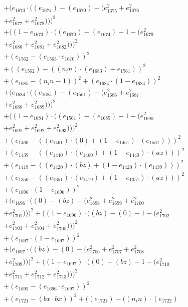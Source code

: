 \documentclass[10pt, a4paper]{article}
\begin{document}
\begin{small}
\begin{align*}
& + (e_{1673}  \cdot  ((e_{1674}) - (e_{1670}) - (e_{1675}^{2} + e_{1676}^{2} \\
& + e_{1677}^{2} + e_{1678}^{2})))^{2} \\
& + ((1 - e_{1673})  \cdot  ((e_{1670}) - (e_{1674}) - 1 - (e_{1679}^{2} \\
& + e_{1680}^{2} + e_{1681}^{2} + e_{1682}^{2})))^{2} \\
& + (e_{1562} - (e_{1563}  \cdot  e_{1670}))^{2} \\
& + ((e_{1562}) - ((n_in)  \cdot  (e_{1683}) + e_{1561}))^{2} \\
& + (e_{1685} - (n_in - 1))^{2} + (e_{1684}  \cdot  (1 - e_{1684}))^{2} \\
& + (e_{1684}  \cdot  ((e_{1685}) - (e_{1561}) - (e_{1686}^{2} + e_{1687}^{2} \\
& + e_{1688}^{2} + e_{1689}^{2})))^{2} \\
& + ((1 - e_{1684})  \cdot  ((e_{1561}) - (e_{1685}) - 1 - (e_{1690}^{2} \\
& + e_{1691}^{2} + e_{1692}^{2} + e_{1693}^{2})))^{2} \\
& + (e_{1460} - ((e_{1461})  \cdot  (0) + (1 - e_{1461})  \cdot  (e_{1561})))^{2} \\
& + (e_{1439} - ((e_{1440})  \cdot  (e_{1460}) + (1 - e_{1440})  \cdot  (az)))^{2} \\
& + (e_{1419} - ((e_{1420})  \cdot  (bz) + (1 - e_{1420})  \cdot  (e_{1439})))^{2} \\
& + (e_{1350} - ((e_{1351})  \cdot  (e_{1419}) + (1 - e_{1351})  \cdot  (az)))^{2} \\
& + (e_{1696}  \cdot  (1 - e_{1696}))^{2} \\
& + (e_{1696}  \cdot  ((0) - (bz) - (e_{1698}^{2} + e_{1699}^{2} + e_{1700}^{2} \\
& + e_{1701}^{2})))^{2} + ((1 - e_{1696})  \cdot  ((bz) - (0) - 1 - (e_{1702}^{2} \\
& + e_{1703}^{2} + e_{1704}^{2} + e_{1705}^{2})))^{2} \\
& + (e_{1697}  \cdot  (1 - e_{1697}))^{2} \\
& + (e_{1697}  \cdot  ((bz) - (0) - (e_{1706}^{2} + e_{1707}^{2} + e_{1708}^{2} \\
& + e_{1709}^{2})))^{2} + ((1 - e_{1697})  \cdot  ((0) - (bz) - 1 - (e_{1710}^{2} \\
& + e_{1711}^{2} + e_{1712}^{2} + e_{1713}^{2})))^{2} \\
& + (e_{1695} - (e_{1696}  \cdot  e_{1697}))^{2} \\
& + (e_{1721} - (bx  \cdot  bx))^{2} + ((e_{1721}) - ((n_in)  \cdot  (e_{1722}) \\

\end{align*}
\end{small}
\end{document}
